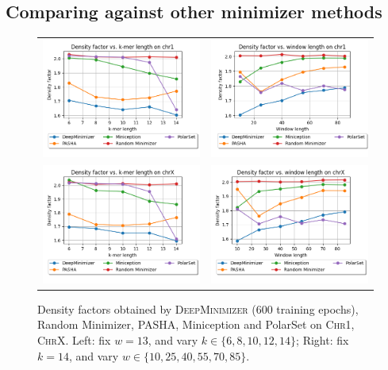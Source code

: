 \subsection{Comparing against other minimizer methods}
\begin{figure}[h]
\begin{tabular}{cc}
\includegraphics[width=0.46\columnwidth]{minimizer_plots/compare_k_chr1.png} & \includegraphics[width=0.46\columnwidth]{minimizer_plots/compare_w_chr1.png} \\
\includegraphics[width=0.46\columnwidth]{minimizer_plots/compare_k_chrX.png} & \includegraphics[width=0.46\columnwidth]{minimizer_plots/compare_w_chrX.png}
\end{tabular}
\caption{Density factors obtained by \textsc{DeepMinimizer} (600 training epochs), Random Minimizer, PASHA, Miniception and PolarSet on \textsc{Chr1}, \textsc{ChrX}. Left: fix $w=13$, and vary $k \in \{6,8,10,12,14\}$; Right: fix $k=14$, and vary $w \in \{10, 25, 40, 55, 70, 85\}$.}
\label{app-msd-fig:2a}
\end{figure}
